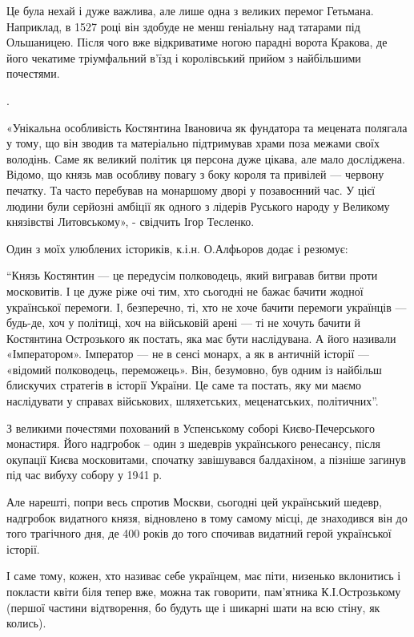 Це була нехай і дуже важлива, але лише одна з великих перемог Гетьмана.
Наприклад, в 1527 році він здобуде не менш геніальну над татарами під
Ольшаницею. Після чого вже відкриватиме ногою парадні ворота Кракова, де його
чекатиме тріумфальний в’їзд і королівський прийом з найбільшими почестями.

.

«Унікальна особливість Костянтина Івановича як фундатора та мецената полягала у
тому, що він зводив та матеріально підтримував храми поза межами своїх
володінь. Саме як великий політик ця персона дуже цікава, але мало досліджена.
Відомо, що князь  мав особливу повагу з боку короля та привілей — червону
печатку. Та часто перебував на монаршому дворі у позавоєнний час. У цієї людини
були серйозні амбіції як одного з лідерів Руського народу у Великому князівстві
Литовському», - свідчить Ігор Тесленко.

Один з моїх улюблених істориків, к.і.н. О.Алфьоров додає і резюмує:

\enquote{Князь Костянтин — це передусім полководець, який вигравав битви проти
московитів. І це дуже ріже очі тим, хто сьогодні не бажає бачити жодної
української перемоги. І, безперечно, ті, хто не хоче бачити перемоги українців
— будь-де, хоч у політиці, хоч на військовій арені — ті не хочуть бачити й
Костянтина Острозького як постать, яка має бути наслідувана. А його називали
«Імператором». Імператор — не в сенсі монарх, а як в античній історії —
«відомий полководець, переможець». Він, безумовно, був одним із найбільш
блискучих стратегів в історії України. Це саме та постать, яку ми маємо
наслідувати у справах військових, шляхетських, меценатських, політичних}.

З великими почестями похований в Успенському соборі Києво-Печерського
монастиря. Його надгробок – один з шедеврів українського ренесансу, після
окупації Києва московитами, спочатку завішувався балдахіном, а пізніше загинув
під час вибуху собору у 1941 р. 

Але нарешті, попри весь спротив Москви, сьогодні цей український шедевр,
надгробок видатного князя, відновлено в тому самому місці, де знаходився він до
того трагічного дня, де 400 років до того спочивав видатний герой української
історії.

І саме тому, кожен, хто називає себе українцем, має піти, низенько вклонитись і
покласти квіти біля тепер вже, можна так говорити, пам’ятника К.І.Острозькому
(першої частини відтворення, бо будуть ще і шикарні шати на всю стіну, як
колись).

